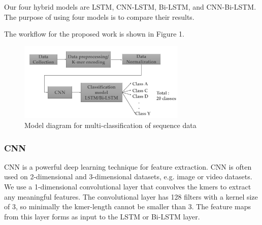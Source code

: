 \documentclass[journal]{IEEEtran}
\begin{document}
    Our four hybrid models are LSTM, CNN-LSTM, Bi-LSTM, and CNN-Bi-LSTM.
    The purpose of using four models is to compare their results.

    The workflow for the proposed work is shown in Figure 1.




    \begin{figure}[h]
      \centering
      \includegraphics[width=8cm]{Model_Diagram.JPG}
      \caption{Model diagram for multi-classification of sequence data}
    \end{figure}

    \subsubsection{CNN}
    CNN is a powerful deep learning technique for feature extraction.
    CNN is often used on 2-dimensional and 3-dimensional datasets, e.g. image or video datasets.
    We use a 1-dimensional convolutional layer that convolves the kmers to extract any meaningful
    features. The convolutional layer has 128 filters with a kernel size of 3, so minimally the kmer-length cannot be
    smaller than 3. The feature maps from this layer forms as input to the LSTM or Bi-LSTM layer.
\end{document}
